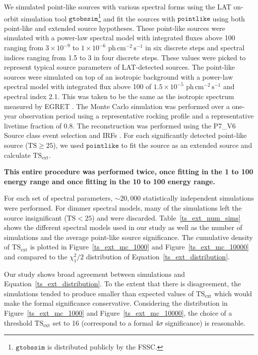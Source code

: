 \documentclass[12pt,preprint]{aastex}
\newcommand{\mev}{\text{MeV}\xspace}
\newcommand{\gev}{\text{GeV}\xspace}
\newcommand{\phflux}{\ensuremath{\text{ph}\,\text{cm}^{-2}\,\text{s}^{-1}}\xspace}
\newcommand{\tsext}{{\ensuremath{\text{TS}_{\text{ext}}}}\xspace}
\newcommand{\ts}{\text{TS}\xspace}
\newcommand{\pointlike}{\ensuremath{\mathtt{pointlike}}\xspace}
\newcommand{\gtobssim}{\ensuremath{\mathtt{gtobssim}}\xspace}
\newcommand{\newtext}[1]{{\bfseries \color{red}#1}}
\begin{document}
We simulated point-like sources with various spectral forms using
the LAT on-orbit simulation tool
\gtobssim\footnote{\gtobssim is distributed publicly by the FSSC.} and fit the sources
with \pointlike using both point-like
and extended source hypotheses.  These point-like sources were simulated with a power-law
spectral model with integrated fluxes above 100 \mev ranging from $3\times10^{-9}$ 
to $1\times10^{-6}$ \phflux in six discrete steps and spectral
indices ranging from 1.5 to 3 in four discrete steps.  These values
were picked to represent typical source parameters of LAT-detected
sources. The point-like sources were simulated on top of an isotropic
background with a power-law spectral model with
integrated flux above 100 \mev of $1.5\times10^{-5}$ \phflux
and spectral index 2.1.
This was
taken to be the same as the isotropic spectrum measured by EGRET
\citep{sreekumar_isotropic}.  The Monte Carlo simulation was performed
over a one-year observation period using a representative rocking profile and a
representative livetime fraction of 0.8.  The reconstruction was performed
using the P7\_V6 Source class event selection and IRFs \citep{lat_on_orbit_psf}. For each 
significantly detected point-like source ($\ts\ge25$), we used \pointlike
to fit the source as an extended source and calculate \tsext.
\newtext{
This entire procedure was performed twice, once fitting in the 1 \gev
to 100 \gev energy range and once fitting in the 10 \gev to 100 \gev
energy range.

For each set of spectral parameters, $\sim20,000$ statistically independent
simulations were performed. For dimmer spectral models, many of the
simulations left the source insignificant ($\ts<25$)
and were discarded.  Table~\ref{ts_ext_num_sims}
shows the different spectral models used in our study as well as the
number of simulations and the average point-like source
significance.  The cumulative density of \tsext is plotted in
Figure~\ref{ts_ext_mc_1000} and Figure~\ref{ts_ext_mc_10000} 
and compared to the $\chi^2_1/2$ distribution of
Equation~\ref{ts_ext_distribution}.

Our study shows broad agreement between simulations and
Equation~\ref{ts_ext_distribution}. To the extent that there is
disagreement, the simulations tended to produce smaller than expected
values of \tsext which would make the formal significance conservative.
Considering the distribution in Figure~\ref{ts_ext_mc_1000} and
Figure~\ref{ts_ext_mc_10000}, the choice of a threshold \tsext set to 16
(correspond to a formal $4\sigma$ significance) is reasonable.
}
\end{document}
